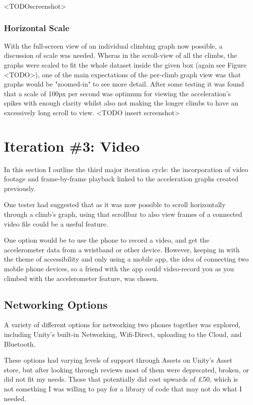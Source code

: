 <TODOscreenshot>



\subsubsection{Horizontal Scale}
With the full-screen view of an individual climbing graph now possible, a discussion of scale was needed. 
Wheras in the scroll-view of all the climbs, the graphs were scaled to fit the whole dataset inside the given box (again see Figure <TODO>), one of the main expectations of the per-climb graph view was that graphs would be "zoomed-in" to see more detail.
After some testing it was found that a scale of 100px per second was optimum for viewing the acceleration's spikes with enough clarity whilst also not making the longer climbs to have an excessively long scroll to view. 
<TODO insert screenshot>





\section{Iteration \#3: Video}
In this section I outline the third major iteration cycle: the incorporation of video footage and frame-by-frame playback linked to the acceleration graphs created previously.


One tester had suggested that as it was now possible to scroll horizontally through a climb's graph, using that scrollbar to also view frames of a connected video file could be a useful feature.

One option would be to use the phone to record a video, and get the accelerometer data from a wristband or other device.
However, keeping in with the theme of accessibility and only using a mobile app, the idea of connecting two mobile phone devices, so a friend with the app could video-record you as you climbed with the accelerometer feature, was chosen.


\subsection{Networking Options}
A variety of different options for networking two phones together was explored, including Unity's built-in Networking, Wifi-Direct, uploading to the Cloud, and Bluetooth.


These options had varying levels of support through Assets on Unity's Asset store, but after looking through reviews most of them were deprecated, broken, or did not fit my needs.
Those that potentially did cost upwards of \pounds50, which is not something I was willing to pay for a library of code that may not do what I needed.


